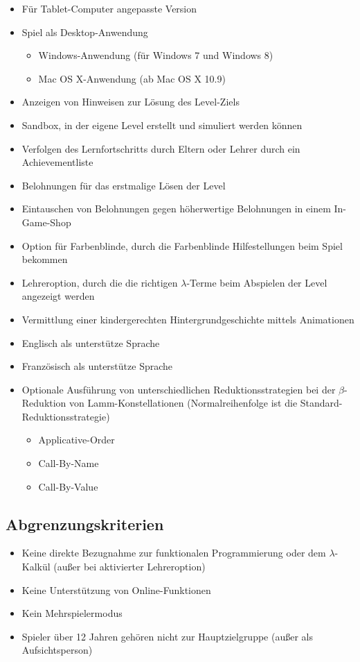 \begin{itemize}
	\item Für Tablet-Computer angepasste Version
	\item Spiel als Desktop-Anwendung
	\begin{itemize}
		\item Windows-Anwendung (für Windows 7 und Windows 8)
		\item Mac OS X-Anwendung (ab Mac OS X 10.9)
	\end{itemize}
	\item Anzeigen von Hinweisen zur Lösung des Level-Ziels
	\item Sandbox, in der eigene Level erstellt und simuliert werden können
	\item Verfolgen des Lernfortschritts durch Eltern oder Lehrer durch ein Achievementliste
	\item Belohnungen für das erstmalige Lösen der Level
	\item Eintauschen von Belohnungen gegen höherwertige Belohnungen in einem In-Game-Shop
	\item Option für Farbenblinde, durch die Farbenblinde Hilfestellungen beim Spiel bekommen
	\item Lehreroption, durch die die richtigen $\lambda$-Terme beim Abspielen der Level angezeigt werden
	\item Vermittlung einer kindergerechten Hintergrundgeschichte mittels Animationen
	\item Englisch als unterstütze Sprache
	\item Französisch als unterstütze Sprache
	\item Optionale Ausführung von unterschiedlichen Reduktionsstrategien bei der $\beta$-Reduktion von Lamm-Konstellationen (Normalreihenfolge ist die Standard-Reduktionsstrategie)
	\begin{itemize}
		\item Applicative-Order
		\item Call-By-Name
		\item Call-By-Value
	\end{itemize}
		
\end{itemize}

\subsection{Abgrenzungskriterien}

\begin{itemize}
	\item Keine direkte Bezugnahme zur funktionalen Programmierung oder dem $\lambda$-Kalkül (außer bei aktivierter Lehreroption) 
	\item Keine Unterstützung von Online-Funktionen
	\item Kein Mehrspielermodus
	\item Spieler über 12 Jahren gehören nicht zur Hauptzielgruppe (außer als Aufsichtsperson)
\end{itemize}

